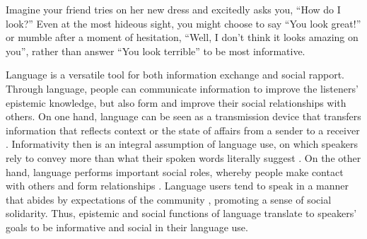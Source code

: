 \documentclass[12pt]{article}
\newcommand{\ejy}[1]{\textcolor{Red}{[ejy: #1]}}
\begin{document}


Imagine your friend tries on her new dress and excitedly asks you, \enquote{How do I look?} 
Even at the most hideous sight, you might choose to say \enquote{You look great!} or mumble
after a moment of hesitation, \enquote{Well, I don't think it looks amazing on you},
rather than answer \enquote{You look terrible} to be most informative. 

Language is a versatile tool for both information exchange and social rapport. 
Through language, people can communicate information to improve the listeners' epistemic knowledge, 
but also form and improve their social relationships with others.
On one hand, language can be seen as a transmission device that transfers information 
that reflects context or the state of affairs from a sender to a receiver \cite{buhler1934, shannon1948, jakobson1960}.
Informativity then is an integral assumption of language use, 
on which speakers rely to convey more than what their spoken words literally suggest \cite{grice1975, searle1975}.
On the other hand, language performs important social roles, 
whereby people make contact with others and form relationships \cite{halliday1975, ervin1967}. 
Language users tend to speak in a manner that abides by expectations of the community \cite{ervin1969}, 
promoting a sense of social solidarity. 
Thus, epistemic and social functions of language translate to speakers' goals to be informative and social in their language use.
 
\end{document}
